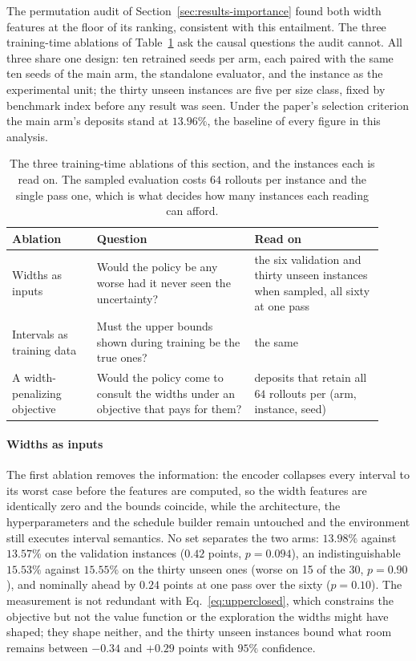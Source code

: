 \documentclass[preprint,12pt]{elsarticle}
\theoremstyle{definition}
\theoremstyle{remark}
\begin{document}
The permutation audit of Section~\ref{sec:results-importance} found
both width features at the floor of its ranking, consistent with this
entailment. The three training-time ablations of
Table~\ref{tab:ablations} ask the causal questions the audit cannot.
All three share one design: ten retrained seeds per arm, each paired
with the same ten seeds of the main arm, the standalone evaluator,
and the instance as the experimental unit; the thirty unseen
instances are five per size class, fixed by benchmark index before
any result was seen. Under the paper's selection criterion the main
arm's deposits stand at $13.96\%$, the baseline of every figure in
this analysis.

\begin{table}[t]
\centering\small
\caption{The three training-time ablations of this section, and the
instances each is read on. The sampled evaluation costs $64$ rollouts
per instance and the single pass one, which is what decides how many
instances each reading can afford.}
\label{tab:ablations}
\setlength{\tabcolsep}{4pt}
\renewcommand{\arraystretch}{1.2}
\begin{tabular}{@{}p{0.21\linewidth}p{0.39\linewidth}p{0.32\linewidth}@{}}
\toprule
Ablation & Question & Read on \\
\midrule
Widths as inputs &
Would the policy be any worse had it never seen the uncertainty? &
the six validation and thirty unseen instances when sampled, all
sixty at one pass \\
Intervals as training data &
Must the upper bounds shown during training be the true ones? &
the same \\
A width-penalizing objective &
Would the policy come to consult the widths under an objective that
pays for them? &
deposits that retain all $64$ rollouts per (arm, instance, seed) \\
\bottomrule
\end{tabular}
\end{table}

\paragraph{Widths as inputs} The first ablation removes the
information: the encoder collapses every interval to its worst case
before the features are computed, so the width features are
identically zero and the bounds coincide, while the architecture, the
hyperparameters and the schedule builder remain untouched and the
environment still executes interval semantics. No set separates the
two arms: $13.98\%$ against $13.57\%$ on the validation instances
($0.42$ points, $p=0.094$), an indistinguishable $15.53\%$ against
$15.55\%$ on the thirty unseen ones (worse on 15 of the 30,
$p=0.90$), and nominally ahead by $0.24$ points at one pass over the
sixty ($p=0.10$). The measurement is not redundant with
Eq.~\eqref{eq:upperclosed}, which constrains the objective but not
the value function or the exploration the widths might have shaped;
they shape neither, and the thirty unseen instances bound what room
remains between $-0.34$ and $+0.29$ points with $95\%$ confidence.
\end{document}
